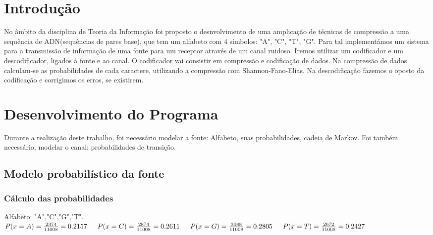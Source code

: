 \documentclass[12pt]{article}
\begin{document}
\tableofcontents

\newpage

\section{Introdução}
\indent \indent No âmbito da disciplina de Teoria da Informação foi proposto o desnvolvimento de uma amplicação de técnicas de compressão a uma sequência de ADN(sequências de pares base), que tem um alfabeto com 4 símbolos: "A", "C", "T", "G". Para tal implementámos um sistema para a transmissão de informação de uma fonte para um receptor através de um canal ruidoso. \newline
\indent Iremos utilizar um codificador e um descodificador, ligados à fonte e ao canal. O codificador vai consistir em compressão e codificação de dados. Na compressão de dados calculam-se as probabilidades de cada caractere, utilizando a compressão com Shannon-Fano-Elias.
\newline
\indent
Na descodificação fazemos o oposto da codificação e corrigimos os erros, se existirem.
\newpage


\section{Desenvolvimento do Programa}
\indent \indent Durante a realização deste trabalho, foi necessário modelar a fonte: Alfabeto, suas probabilidades, cadeia de Markov.
Foi também necessário, modelar o canal: probabilidades de transição.
\newline
\newline
\subsection{Modelo probabilístico da fonte} 
\subsubsection{Cálculo das probabilidades}
\indent\indent Alfabeto: "A","C","G","T".
\newline
\newline
\indent $P(x=A)=\frac{2374}{11008}=0.2157
\newline
\newline\indent P(x=C)=\frac{2874}{11008}=0.2611 
\newline
\newline\indent P(x=G)=\frac{3088}{11008}=0.2805 
\newline
\newline\indent P(x=T)=\frac{2672}{11008}=0.2427
$
\newline
\end{document}
